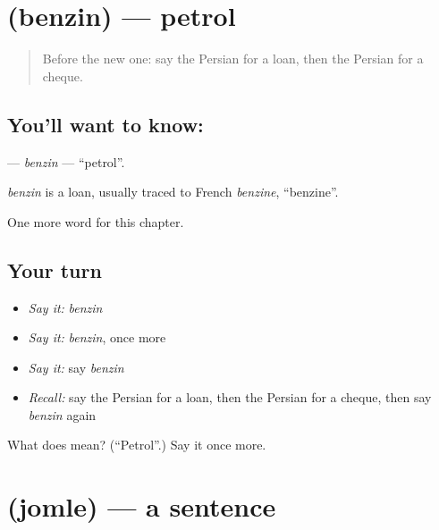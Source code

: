 \section[\texorpdfstring{\fa{بنزین} (benzin)}{بنزین (benzin)}]{ (benzin) — petrol}

\label{lesson:FA-C242-benzin}



\begin{quote}
Before the new one: say the Persian for a loan, then the Persian for a cheque.
\end{quote}

\subsection*{You'll want to know: }
\textbf{} — \emph{benzin} — \textquotedblleft{}petrol\textquotedblright{}.

\begin{cousinweb}
\emph{benzin} is a loan, usually traced to French \emph{benzine}, \textquotedblleft{}benzine\textquotedblright{}.
\end{cousinweb}

\begin{grammarlens}[title={What you've built}]
One more word for this chapter.
\end{grammarlens}

\subsection*{Your turn}
\begin{itemize}
\raggedright
  \item \emph{Say it:} \emph{benzin}
  \item \emph{Say it:} \emph{benzin}, once more
  \item \emph{Say it:} say \emph{benzin}
  \item \emph{Recall:} say the Persian for a loan, then the Persian for a cheque, then say \emph{benzin} again
\end{itemize}

\begin{tcolorbox}[breakable,colback=teal!4,colframe=teal!35!black,title={Before you move on}]
What does  mean? (\textquotedblleft{}Petrol\textquotedblright{}.) Say it once more.
\end{tcolorbox}
\section[\texorpdfstring{\fa{جمله} (jomle)}{جمله (jomle)}]{ (jomle) — a sentence}


